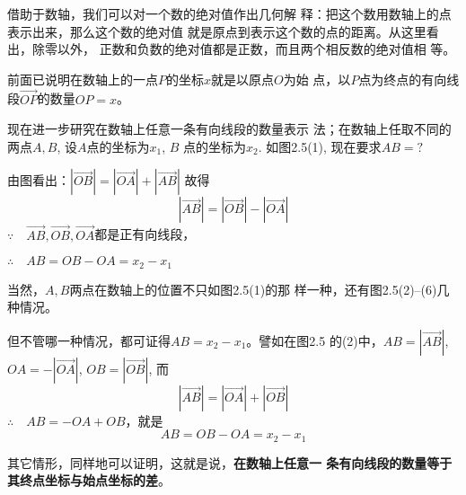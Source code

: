 借助于数轴，我们可以对一个数的绝对值作出几何解
释：把这个数用数轴上的点表示出来，那么这个数的绝对值
就是原点到表示这个数的点的距离。从这里看出，除零以外，
正数和负数的绝对值都是正数，而且两个相反数的绝对值相
等。

前面已说明在数轴上的一点$P$的坐标$x$就是以原点$O$为始
点，以$P$点为终点的有向线段$\Vec{OP}$的数量$OP=x$。

现在进一步研究在数轴上任意一条有向线段的数量表示
法；在数轴上任取不同的两点$A,B$, 设$A$点的坐标为$x_1$, $B$
点的坐标为$x_2$. 如图2.5(1), 现在要求$AB=?$

由图看出：$|\Vec{OB}|=|\Vec{OA}|+|\Vec{AB}|$
故得
\[|\Vec{AB}|=|\Vec{OB}|-|\Vec{OA}|\]
$\because\quad \Vec{AB}, \Vec{OB}, \Vec{OA}$都是正有向线段，

$\therefore\quad AB=OB-OA=x_2-x_1$

当然，$A,B$两点在数轴上的位置不只如图2.5(1)的那
样一种，还有图2.5(2)--(6)几种情况。

\begin{figure}[htp]
    \centering
    \caption{}
\end{figure}



但不管哪一种情况，都可证得$AB=x_2-x_1$。譬如在图2.5
的(2)中，$AB=|\Vec{AB}|$, $OA=-|\Vec{OA}|$, $OB=|\Vec{OB}|$, 而
\[|\Vec{AB}|=|\Vec{OA}|+|\Vec{OB}|\]
$\therefore\quad AB=-OA+OB$，就是
\[AB=OB-OA=x_2-x_1\]

其它情形，同样地可以证明，这就是说，\textbf{在数轴上任意一
条有向线段的数量等于其终点坐标与始点坐标的差}。

